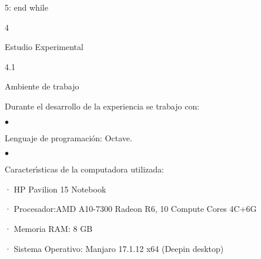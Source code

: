 \documentclass[a4paper,portrait,12pt]{article}
\begin{document}
\begin{flushleft}
5: end while
\end{flushleft}





4





\begin{flushleft}
Estudio Experimental
\end{flushleft}





4.1





\begin{flushleft}
Ambiente de trabajo
\end{flushleft}





\begin{flushleft}
Durante el desarrollo de la experiencia se trabajo con:
\end{flushleft}


$\bullet$





\begin{flushleft}
Lenguaje de programación: Octave.
\end{flushleft}





$\bullet$





\begin{flushleft}
Caracter\i{}́sticas de la computadora utilizada:
\end{flushleft}


\begin{flushleft}
· HP Pavilion 15 Notebook
\end{flushleft}


\begin{flushleft}
· Procesador:AMD A10-7300 Radeon R6, 10 Compute Cores 4C+6G
\end{flushleft}


\begin{flushleft}
· Memoria RAM: 8 GB
\end{flushleft}


\begin{flushleft}
· Sistema Operativo: Manjaro 17.1.12 x64 (Deepin desktop)
\end{flushleft}
\end{document}
